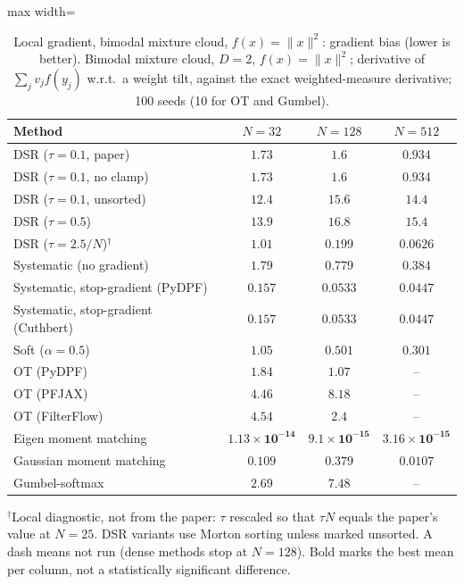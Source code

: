 \begin{table}[H]
\centering
\small
\caption{Local gradient, bimodal mixture cloud, $f(x)=\|x\|^2$: gradient bias (lower is better). Bimodal mixture cloud, $D{=}2$, $f(x)=\|x\|^2$; derivative of $\sum_j v_j f(y_j)$ w.r.t.\ a weight tilt, against the exact weighted-measure derivative; 100 seeds (10 for OT and Gumbel).}
\label{tab:grad-mixture-x2-gradient_bias}
\begin{adjustbox}{max width=\linewidth}
\begin{tabular}{lccc}
\toprule
Method & $N{=}32$ & $N{=}128$ & $N{=}512$ \\
\midrule
DSR ($\tau{=}0.1$, paper) & $1.73$ & $1.6$ & $0.934$ \\
DSR ($\tau{=}0.1$, no clamp) & $1.73$ & $1.6$ & $0.934$ \\
DSR ($\tau{=}0.1$, unsorted) & $12.4$ & $15.6$ & $14.4$ \\
DSR ($\tau{=}0.5$) & $13.9$ & $16.8$ & $15.4$ \\
DSR ($\tau{=}2.5/N$)$^\dagger$ & $1.01$ & $0.199$ & $0.0626$ \\
\midrule
Systematic (no gradient) & $1.79$ & $0.779$ & $0.384$ \\
Systematic, stop-gradient (PyDPF) & $0.157$ & $0.0533$ & $0.0447$ \\
Systematic, stop-gradient (Cuthbert) & $0.157$ & $0.0533$ & $0.0447$ \\
Soft ($\alpha{=}0.5$) & $1.05$ & $0.501$ & $0.301$ \\
OT (PyDPF) & $1.84$ & $1.07$ & -- \\
OT (PFJAX) & $4.46$ & $8.18$ & -- \\
OT (FilterFlow) & $4.54$ & $2.4$ & -- \\
Eigen moment matching & $\mathbf{1.13\times10^{-14}}$ & $\mathbf{9.1\times10^{-15}}$ & $\mathbf{3.16\times10^{-15}}$ \\
Gaussian moment matching & $0.109$ & $0.379$ & $0.0107$ \\
Gumbel-softmax & $2.69$ & $7.48$ & -- \\
\bottomrule
\end{tabular}
\end{adjustbox}
\par\smallskip\parbox{0.95\linewidth}{\footnotesize $^\dagger$Local diagnostic, not from the paper: $\tau$ rescaled so that $\tau N$ equals the paper's value at $N{=}25$. DSR variants use Morton sorting unless marked unsorted. A dash means not run (dense methods stop at $N{=}128$). Bold marks the best mean per column, not a statistically significant difference.}
\end{table}


